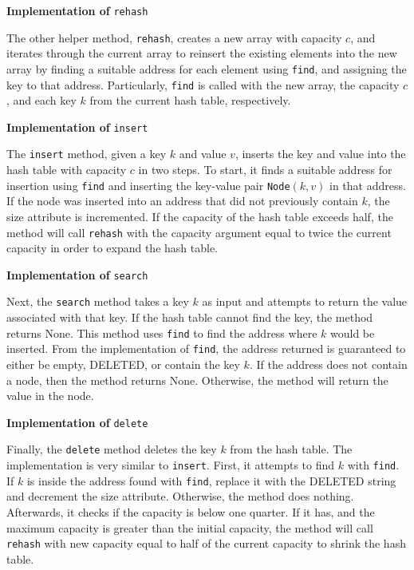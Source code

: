\documentclass[11pt]{article}
\begin{document}
    \medskip

    \textbf{Implementation of} \texttt{rehash}

    The other helper method, \texttt{rehash}, creates a new array with capacity \(c\), and iterates through the current array to reinsert the existing elements into the new array by finding a suitable address for each element using \texttt{find}, and assigning the key to that address. Particularly, \texttt{find} is called with the new array, the capacity \(c\), and each key \(k\) from the current hash table, respectively.

    \medskip

    \textbf{Implementation of} \texttt{insert}

    The \texttt{insert} method, given a key \(k\) and value \(v\), inserts the key and value into the hash table with capacity \(c\) in two steps. To start, it finds a suitable address for insertion using \texttt{find} and inserting the key-value pair \texttt{Node}\((k,v)\) in that address. If the node was inserted into an address that did not previously contain \(k\), the size attribute is incremented. If the capacity of the hash table exceeds half, the method will call \texttt{rehash} with the capacity argument equal to twice the current capacity in order to expand the hash table.

    \medskip

    \textbf{Implementation of} \texttt{search}

    Next, the \texttt{search} method takes a key \(k\) as input and attempts to return the value associated with that key. If the hash table cannot find the key, the method returns None. This method uses \texttt{find} to find the address where \(k\) would be inserted. From the implementation of \texttt{find}, the address returned is guaranteed to either be empty, DELETED, or contain the key \(k\). If the address does not contain a node, then the method returns None. Otherwise, the method will return the value in the node.

    \medskip

    \textbf{Implementation of} \texttt{delete}

    Finally, the \texttt{delete} method deletes the key \(k\) from the hash table. The implementation is very similar to \texttt{insert}. First, it attempts to find \(k\) with \texttt{find}. If \(k\) is inside the address found with \texttt{find}, replace it with the DELETED string and decrement the size attribute. Otherwise, the method does nothing. Afterwards, it checks if the capacity is below one quarter. If it has, and the maximum capacity is greater than the initial capacity, the method will call \texttt{rehash} with new capacity equal to half of the current capacity to shrink the hash table.
\end{document}
